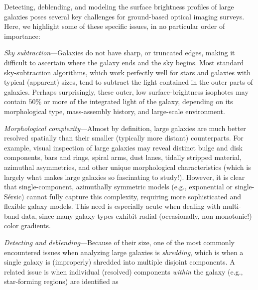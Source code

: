 Detecting, deblending, and modeling the surface brightness profiles of large
galaxies poses several key challenges for ground-based optical imaging surveys.
Here, we highlight some of these specific issues, in no particular order of
importance:
\begin{itemize*}
\item{{\em Sky subtraction}---Galaxies do not have sharp, or truncated edges,
  making it difficult to ascertain where the galaxy ends and the sky begins.
  Most standard sky-subtraction algorithms, which work perfectly well for stars
  and galaxies with typical (apparent) sizes, tend to subtract the light
  contained in the outer parts of galaxies.  Perhaps surprisingly, these outer,
  low surface-brightness isophotes may contain $50\%$ or more of the integrated
  light of the galaxy, depending on its morphological type, mass-assembly
  history, and large-scale environment.}
\item{{\em Morphological complexity}---Almost by definition, large galaxies are
  much better resolved spatially than their smaller (typically more distant)
  counterparts.  For example, visual inspection of large galaxies may reveal
  distinct bulge and disk components, bars and rings, spiral arms, dust lanes,
  tidally stripped material, azimuthal asymmetries, and other unique
  morphological characteristics (which is largely what makes large galaxies so
  fascinating to study!).  However, it is clear that single-component,
  azimuthally symmetric models (e.g., exponential or single-S\'{e}rsic) cannot
  fully capture this complexity, requiring more sophisticated and flexible
  galaxy models.  This need is especially acute when dealing with multi-band
  data, since many galaxy types exhibit radial (occasionally, non-monotonic!)
  color gradients.}
\item{{\em Detecting and deblending}---Because of their size, one of the most
  commonly encountered issues when analyzing large galaxies is \emph{shredding},
  which is when a single galaxy is (improperly) shredded into multiple disjoint
  components.  A related issue is when individual (resolved) components
  \emph{within} the galaxy (e.g., star-forming regions) are identified as
}
\end{itemize*}
